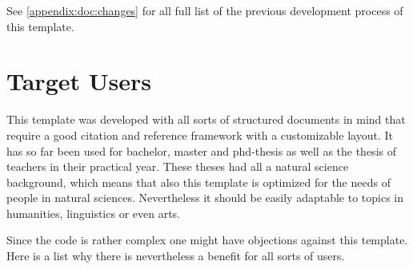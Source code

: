 
See \cref{appendix:doc:changes} for all full list of the previous development process of this template.
\section{Target Users}
\label{sec:doc:targetusers}

This template was developed with all sorts of structured documents in mind that require a good citation and reference framework with a customizable layout. It has so far been used for bachelor, master and phd-thesis as well as the thesis of teachers in their practical year. These theses had all a natural science background, which means that also this template is optimized for the needs of people in natural sciences. Nevertheless it should be easily adaptable to topics in humanities, linguistics or even arts.

Since the code is rather complex one might have objections against this template. Here is a list why there is nevertheless a benefit for all sorts of users.

